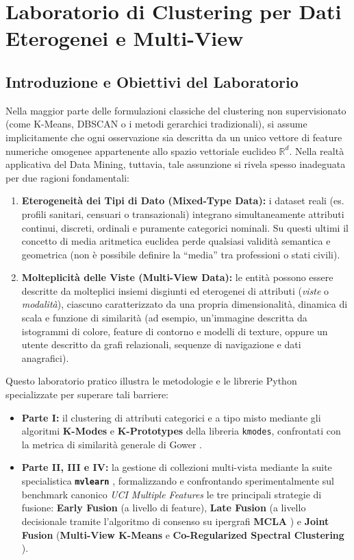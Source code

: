 \chapter{Laboratorio di Clustering per Dati Eterogenei e Multi-View}
\label{chap:lab-clustering-heterogeneous-multiview}

\FloatBarrier
\section{Introduzione e Obiettivi del Laboratorio}
\label{sec:lab-het-mv-intro}

Nella maggior parte delle formulazioni classiche del clustering non supervisionato (come K-Means, DBSCAN o i metodi gerarchici tradizionali), si assume implicitamente che ogni osservazione sia descritta da un unico vettore di feature numeriche omogenee appartenente allo spazio vettoriale euclideo $\mathbb{R}^d$. Nella realtà applicativa del Data Mining, tuttavia, tale assunzione si rivela spesso inadeguata per due ragioni fondamentali:
\begin{enumerate}
    \item \textbf{Eterogeneità dei Tipi di Dato (Mixed-Type Data):} i dataset reali (es. profili sanitari, censuari o transazionali) integrano simultaneamente attributi continui, discreti, ordinali e puramente categorici nominali. Su questi ultimi il concetto di media aritmetica euclidea perde qualsiasi validità semantica e geometrica (non è possibile definire la ``media'' tra professioni o stati civili).
    \item \textbf{Molteplicità delle Viste (Multi-View Data):} le entità possono essere descritte da molteplici insiemi disgiunti ed eterogenei di attributi (\textit{viste} o \textit{modalità}), ciascuno caratterizzato da una propria dimensionalità, dinamica di scala e funzione di similarità (ad esempio, un'immagine descritta da istogrammi di colore, feature di contorno e modelli di texture, oppure un utente descritto da grafi relazionali, sequenze di navigazione e dati anagrafici).
\end{enumerate}

Questo laboratorio pratico illustra le metodologie e le librerie Python specializzate per superare tali barriere:
\begin{itemize}
    \item \textbf{Parte I:} il clustering di attributi categorici e a tipo misto mediante gli algoritmi \textbf{K-Modes} e \textbf{K-Prototypes} \cite{huang1998} della libreria \texttt{kmodes}, confrontati con la metrica di similarità generale di Gower \cite{gower1971}.
    \item \textbf{Parte II, III e IV:} la gestione di collezioni multi-vista mediante la suite specialistica \textbf{\texttt{mvlearn}} \cite{perry2021}, formalizzando e confrontando sperimentalmente sul benchmark canonico \textit{UCI Multiple Features} le tre principali strategie di fusione: \textbf{Early Fusion} (a livello di feature), \textbf{Late Fusion} (a livello decisionale tramite l'algoritmo di consenso su ipergrafi \textbf{MCLA} \cite{strehl2002}) e \textbf{Joint Fusion} (\textbf{Multi-View K-Means} e \textbf{Co-Regularized Spectral Clustering} \cite{kumar2011}).
\end{itemize}

